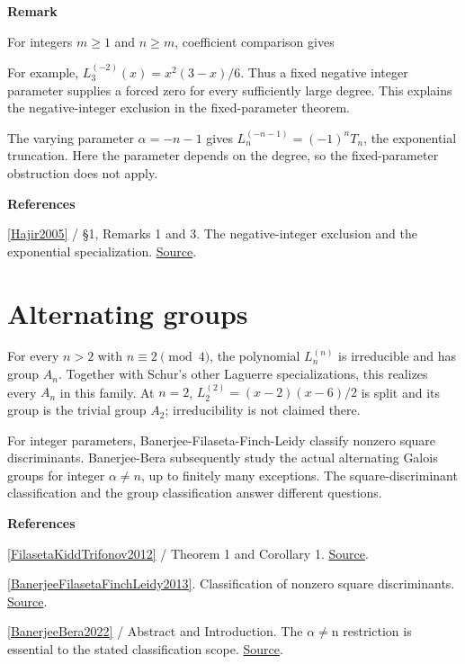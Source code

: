 \documentclass[11pt,a4paper,oneside,openany]{book}
\newcommand{\atlasdisplay}[1]{\par\begingroup\centering\vspace{3pt}\noindent\adjustbox{max width=\linewidth}{\(\displaystyle #1\)}\par\vspace{5pt}\endgroup}
\newenvironment{sources}{\par\smallskip\begingroup\footnotesize\color{atlasgray}\leftskip=10pt\setlength{\parskip}{2pt}}{\par\endgroup\smallskip}
\begin{document}
\begin{atlasblock}[boundary]
\textbf{\sffamily Remark}\par\smallskip
\color{black} For integers \(m\ge1\) and \(n\ge m\), coefficient comparison gives\par

\atlasdisplay{L_n^{(-m)}(x)=(-x)^m\frac{(n-m)!}{n!}L_{n-m}^{(m)}(x).}
\color{black} For example, \(L_3^{(-2)}(x)=x^2(3-x)/6\). Thus a fixed negative integer parameter supplies a forced zero for every sufficiently large degree. This explains the negative-integer exclusion in the fixed-parameter theorem.\par
\end{atlasblock}\color{black}
\color{black} The varying parameter \(\alpha=-n-1\) gives \(L_n^{(-n-1)}=(-1)^n T_n\), the exponential truncation. Here the parameter depends on the degree, so the fixed-parameter obstruction does not apply.\par
\begin{sources}
\textbf{References}\par\smallskip
\noindent\hyperlink{ref:Hajir2005}{[Hajir2005]} / §1, Remarks 1 and 3. The negative-integer exclusion and the exponential specialization. \href{https://jtnb.centre-mersenne.org/item/JTNB_2005__17_2_517_0/}{Source}.\par
\end{sources}\color{black}
\section{Alternating groups}
\color{black} For every \(n>2\) with \(n\equiv2\pmod4\), the polynomial \(L_n^{(n)}\) is irreducible and has group \(A_n\). Together with Schur's other Laguerre specializations, this realizes every \(A_n\) in this family. At \(n=2\), \(L_2^{(2)}=(x-2)(x-6)/2\) is split and its group is the trivial group \(A_2\); irreducibility is not claimed there.\par
\color{black} For integer parameters, Banerjee-Filaseta-Finch-Leidy classify nonzero square discriminants. Banerjee-Bera subsequently study the actual alternating Galois groups for integer \(\alpha\ne n\), up to finitely many exceptions. The square-discriminant classification and the group classification answer different questions.\par
\begin{sources}
\textbf{References}\par\smallskip
\noindent\hyperlink{ref:FilasetaKiddTrifonov2012}{[FilasetaKiddTrifonov2012]} / Theorem 1 and Corollary 1.  \href{https://doi.org/10.1016/j.jnt.2011.09.012}{Source}.\par
\noindent\hyperlink{ref:BanerjeeFilasetaFinchLeidy2013}{[BanerjeeFilasetaFinchLeidy2013]}. Classification of nonzero square discriminants. \href{https://www.numdam.org/articles/10.5802/jtnb.822/}{Source}.\par
\noindent\hyperlink{ref:BanerjeeBera2022}{[BanerjeeBera2022]} / Abstract and Introduction. The \ensuremath{\alpha}\ensuremath{\ne}n restriction is essential to the stated classification scope. \href{https://doi.org/10.1016/j.jnt.2021.12.009}{Source}.\par
\end{sources}\color{black}
\end{document}
